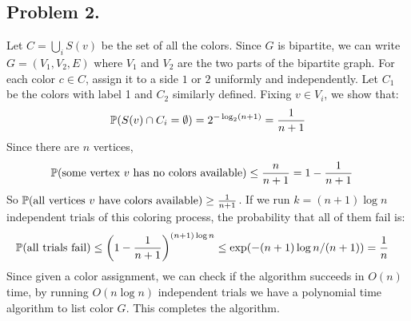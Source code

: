 \documentclass[12pt]{article}
\renewcommand{\P}{\mathbb P\qty}
\begin{document}
    \subsection*{Problem 2.}
    Let $C = \bigcup_i S(v)$ be the set of all the colors. Since $G$ is bipartite, we can write $G = (V_1, V_2, E)$ where $V_1$ and $V_2$ are the two parts of the bipartite graph. For each color $c \in C$, assign it to a side $1$ or $2$ uniformly and independently. Let $C_1$ be the colors with label 1 and $C_2$ similarly defined. Fixing $v \in V_i$, we show that:
    \begin{align*}
        \P(S(v) \cap C_i = \emptyset) = 2^{-\log_2(n+1)} = \frac{1}{n+1}
    \end{align*}
    Since there are $n$ vertices,
    \begin{align*}
        \P(\text{some vertex $v$ has no colors available}) &\leq \frac{n}{n+1} = 1- \frac{1}{n+1}
    \end{align*}
    So $\P(\text{all vertices $v$ have colors available}) \geq \frac{1}{n+1}$. If we run $k = (n+1) \log n$ independent trials of this coloring process, the probability that all of them fail is:
    \begin{align*}
        \P(\text{all trials fail}) &\leq \qty(1 - \frac{1}{n+1})^{(n+1) \log n} \leq \exp(-(n+1) \log n / (n+1)) = \frac{1}{n}
    \end{align*}
    Since given a color assignment, we can check if the algorithm succeeds in $O(n)$ time, by running $O(n \log n)$ independent trials we have a polynomial time algorithm to list color $G$. This completes the algorithm.
\end{document}
